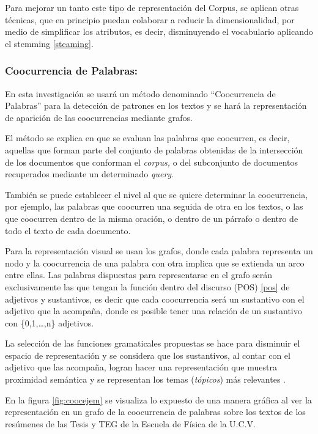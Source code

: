 \documentclass[
  10,
  openany]{book}
\begin{document}
Para mejorar un tanto este tipo de representación del Corpus, se aplican otras técnicas, que en principio puedan colaborar a reducir la dimensionalidad, por medio de simplificar los atributos, es decir, disminuyendo el vocabulario aplicando el stemming \ref{steaming}.

\hypertarget{coocurrencia}{%
\subsubsection{Coocurrencia de Palabras:}\label{coocurrencia}}

En esta investigación se usará un método denominado ``Coocurrencia de Palabras'' para la detección de patrones en los textos y se hará la representación de aparición de las coocurrencias mediante grafos.

El método se explica en que se evaluan las palabras que coocurren, es decir, aquellas que forman parte del conjunto de palabras obtenidas de la intersección de los documentos que conforman el \emph{corpus,} o del subconjunto de documentos recuperados mediante un determinado \emph{query}.

También se puede establecer el nivel al que se quiere determinar la coocurrencia, por ejemplo, las palabras que coocurren una seguida de otra en los textos, o las que coocurren dentro de la misma oración, o dentro de un párrafo o dentro de todo el texto de cada documento.

Para la representación visual se usan los grafos, donde cada palabra representa un nodo y la coocurrencia de una palabra con otra implica que se extienda un arco entre ellas. Las palabras dispuestas para representarse en el grafo serán exclusivamente las que tengan la función dentro del discurso (POS) \ref{pos} de adjetivos y sustantivos, es decir que cada coocurrencia será un sustantivo con el adjetivo que la acompaña, donde es posible tener una relación de un sustantivo con \{0,1,\ldots,n\} adjetivos.

La selección de las funciones gramaticales propuestas se hace para disminuir el espacio de representación y se considera que los sustantivos, al contar con el adjetivo que las acompaña, logran hacer una representación que muestra proximidad semántica y se representan los temas (\emph{tópicos}) más relevantes \citep{segev2021}.

En la figura \ref{fig:coocejem} se visualiza lo expuesto de una manera gráfica al ver la representación en un grafo de la coocurrencia de palabras sobre los textos de los resúmenes de las Tesis y TEG de la Escuela de Física de la U.C.V.
\end{document}
